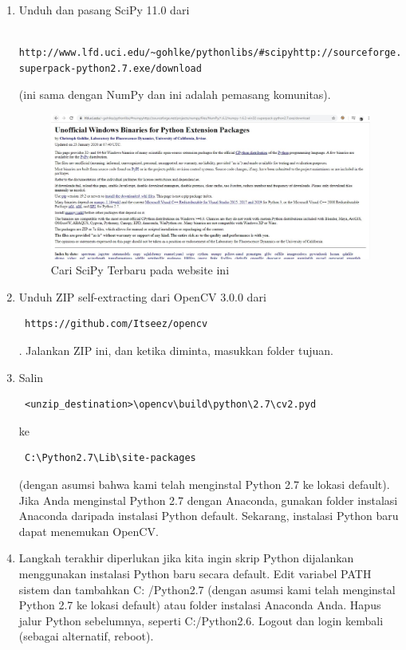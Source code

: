 \begin{enumerate}
\begin{figure}[ht]
		\caption{Cari Numpy terbaru pada wibsite ini}
		\label{contoh}
		\end{figure}
\newpage
	\item Unduh dan pasang SciPy 11.0 dari \begin{verbatim} http://www.lfd.uci.edu/~gohlke/pythonlibs/#scipyhttp://sourceforge.net/projects/scipy/files/scipy/0.11.0/scipy0.11.0win32-superpack-python2.7.exe/download \end{verbatim} (ini sama dengan NumPy dan ini adalah pemasang komunitas).
		\begin{figure}[ht]
		\centering
		\includegraphics[scale=0.5]{figures/1,2.jpg}
		\caption{Cari SciPy Terbaru pada website ini}
		\label{contoh}
		\end{figure}
	\item Unduh ZIP self-extracting dari OpenCV 3.0.0 dari \begin{verbatim} https://github.com/Itseez/opencv \end{verbatim}. Jalankan ZIP ini, dan ketika diminta, masukkan folder tujuan. 
	\item Salin \begin{verbatim} <unzip_destination>\opencv\build\python\2.7\cv2.pyd \end{verbatim} ke \begin{verbatim} C:\Python2.7\Lib\site-packages \end{verbatim} (dengan asumsi bahwa kami telah menginstal Python 2.7 ke lokasi default). Jika Anda menginstal Python 2.7 dengan Anaconda, gunakan folder instalasi Anaconda daripada instalasi Python default. Sekarang, instalasi Python baru dapat menemukan OpenCV.
	\item Langkah terakhir diperlukan jika kita ingin skrip Python dijalankan menggunakan instalasi Python baru secara default. Edit variabel PATH sistem dan tambahkan C: /Python2.7 (dengan asumsi kami telah menginstal Python 2.7 ke lokasi default) atau folder instalasi Anaconda Anda. Hapus jalur Python sebelumnya, seperti C:/Python2.6. Logout dan login kembali (sebagai alternatif, reboot).
\end{enumerate}

